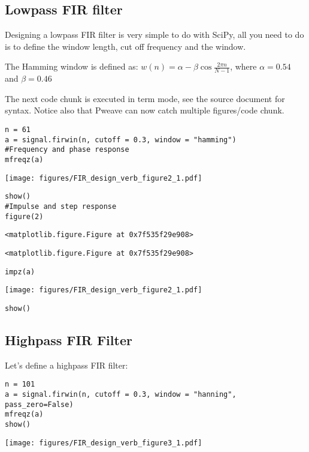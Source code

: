 \documentclass[a4paper,11pt,final]{article}
\begin{document}
\subsection{Lowpass FIR filter}

Designing a lowpass FIR filter is very simple to do with SciPy, all you
need to do is to define the window length, cut off frequency and the
window.

The Hamming window is defined as:
$w(n) = \alpha - \beta\cos\frac{2\pi n}{N-1}$, where $\alpha=0.54$ and
$\beta=0.46$

The next code chunk is executed in term mode, see the source document
for syntax. Notice also that Pweave can now catch multiple
figures/code chunk.


\begin{verbatim}
n = 61
a = signal.firwin(n, cutoff = 0.3, window = "hamming")
#Frequency and phase response
mfreqz(a)
\end{verbatim}
\texttt{[image: figures/FIR\_design\_verb\_figure2\_1.pdf]}

\begin{verbatim}
show()
#Impulse and step response
figure(2)
\end{verbatim}
\begin{verbatim}
<matplotlib.figure.Figure at 0x7f535f29e908>
\end{verbatim}
\begin{verbatim}
<matplotlib.figure.Figure at 0x7f535f29e908>
\end{verbatim}

\begin{verbatim}
impz(a)
\end{verbatim}
\texttt{[image: figures/FIR\_design\_verb\_figure2\_1.pdf]}

\begin{verbatim}
show()
\end{verbatim}


\subsection{Highpass FIR Filter}

Let's define a highpass FIR filter:


\begin{verbatim}
n = 101
a = signal.firwin(n, cutoff = 0.3, window = "hanning", pass_zero=False)
mfreqz(a)
show()
\end{verbatim}
\texttt{[image: figures/FIR\_design\_verb\_figure3\_1.pdf]}
\end{document}
